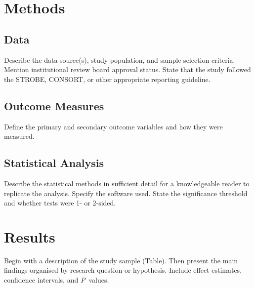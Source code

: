 \documentclass[10pt, letterpaper]{article}
\begin{document}
\section*{Methods}

\subsection*{Data}
Describe the data source(s), study population, and sample selection criteria.
Mention institutional review board approval status. State that the study
followed the STROBE, CONSORT, or other appropriate reporting guideline.

\subsection*{Outcome Measures}
Define the primary and secondary outcome variables and how they were measured.

\subsection*{Statistical Analysis}
Describe the statistical methods in sufficient detail for a knowledgeable
reader to replicate the analysis. Specify the software used. State the
significance threshold and whether tests were 1- or 2-sided.


\section*{Results}

Begin with a description of the study sample (Table).
Then present the main findings organised by research question or hypothesis.
Include effect estimates, confidence intervals, and \textit{P}~values.

\vspace{6pt}
\end{document}
